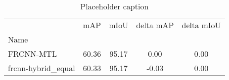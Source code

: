 \begin{table}[htbp]
\centering
\caption{Placeholder caption}
\label{tab:control}
\begin{tabular}{lcccc}
\toprule
 & mAP & mIoU & delta mAP & delta mIoU \\
Name &  &  &  &  \\
\midrule
FRCNN-MTL & 60.36 & 95.17 & 0.00 & 0.00 \\
frcnn-hybrid_equal & 60.33 & 95.17 & -0.03 & 0.00 \\
\bottomrule
\end{tabular}
\end{table}
